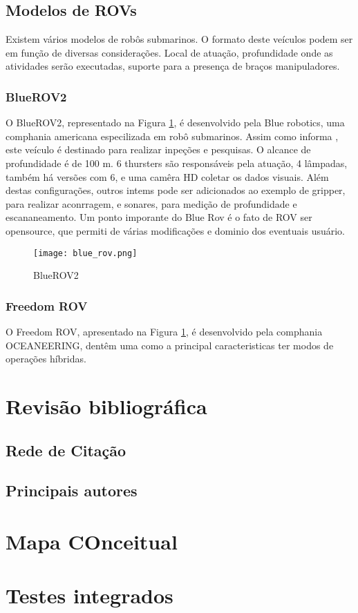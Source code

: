 \subsection{Modelos de ROVs}

Existem vários modelos de robôs submarinos. O formato deste veículos podem ser em função de diversas considerações. Local de atuação, profundidade onde as atividades serão executadas, suporte para a presença de braços manipuladores.
\subsubsection{BlueROV2}
O BlueROV2, representado na Figura \ref{fig:blue}, é desenvolvido pela Blue robotics, uma comphania americana especilizada em robô submarinos. Assim como informa \cite{Bluerobotics}, este veículo é destinado para realizar inpeções e pesquisas. O alcance de profundidade é de 100 m. 6 thursters são responsáveis pela atuação, 4 lâmpadas, também há versões com 6, e uma camêra HD coletar os dados visuais. 
Além destas configurações, outros intems pode ser adicionados ao exemplo de gripper, para realizar aconrragem, e sonares, para medição de profundidade e escananeamento. Um ponto imporante do Blue Rov é o fato de ROV ser opensource,  que permiti de várias modificações e dominio dos eventuais usuário.

\begin{figure}
  \centering 
  \texttt{[image: blue\_rov.png]}
  \caption{BlueROV2}
  \label{fig:blue}
\end{figure}

\subsubsection{Freedom ROV}

O Freedom ROV, apresentado na Figura \ref{fig:blue}, é desenvolvido pela comphania OCEANEERING, dentêm uma como a principal caracteristicas ter modos de operações híbridas.


\section{Revisão bibliográfica}
\subsection{Rede de Citação}
\subsection{Principais autores}
\section{Mapa COnceitual}
\lipsum[1]

\section{Testes integrados}
\label{sec:testi}
\lipsum[1]







